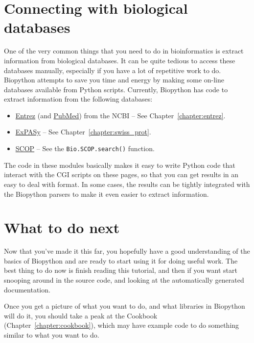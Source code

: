 \documentclass{report}
\begin{document}
\section{Connecting with biological databases}
\label{sec:connecting-with-biological-databases}

One of the very common things that you need to do in bioinformatics is extract information from biological databases. It can be quite tedious to access these databases manually, especially if you have a lot of repetitive work to do. Biopython attempts to save you time and energy by making some on-line databases available from Python scripts. Currently, Biopython has code to extract information from the following databases:

\begin{itemize}
  \item \href{http://www.ncbi.nlm.nih.gov/Entrez/}{Entrez} (and \href{http://www.ncbi.nlm.nih.gov/PubMed/}{PubMed}) from the NCBI -- See Chapter~\ref{chapter:entrez}.
  \item \href{http://www.expasy.org/}{ExPASy} -- See Chapter~\ref{chapter:swiss_prot}.
  \item \href{http://scop.mrc-lmb.cam.ac.uk/scop/}{SCOP} -- See the \verb|Bio.SCOP.search()| function.
\end{itemize}

The code in these modules basically makes it easy to write Python code that interact with the CGI scripts on these pages, so that you can get results in an easy to deal with format. In some cases, the results can be tightly integrated with the Biopython parsers to make it even easier to extract information.

\section{What to do next}

Now that you've made it this far, you hopefully have a good understanding of the basics of Biopython and are ready to start using it for doing useful work. The best thing to do now is finish reading this tutorial, and then if you want start snooping around in the source code, and looking at the automatically generated documentation.

Once you get a picture of what you want to do, and what libraries in Biopython will do it, you should take a peak at the Cookbook (Chapter~\ref{chapter:cookbook}), which may have example code to do something similar to what you want to do.
\end{document}
